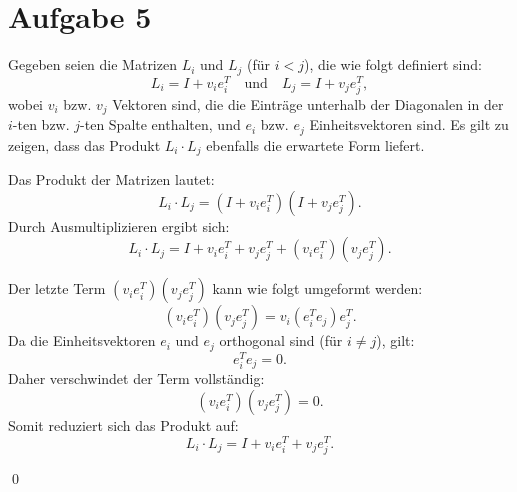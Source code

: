 \section{Aufgabe 5}

Gegeben seien die Matrizen \( L_i \) und \( L_j \) (für \( i < j \)), die wie folgt definiert sind:
\[
L_i = I + v_i e_i^T \quad \text{und} \quad L_j = I + v_j e_j^T,
\]
wobei \( v_i \) bzw. \( v_j \) Vektoren sind, die die Einträge unterhalb der Diagonalen in der \( i \)-ten bzw. \( j \)-ten Spalte enthalten, und \( e_i \) bzw. \( e_j \) Einheitsvektoren sind. Es gilt zu zeigen, dass das Produkt \( L_i \cdot L_j \) ebenfalls die erwartete Form liefert.

Das Produkt der Matrizen lautet:
\[
L_i \cdot L_j = (I + v_i e_i^T)(I + v_j e_j^T).
\]
Durch Ausmultiplizieren ergibt sich:
\[
L_i \cdot L_j = I + v_i e_i^T + v_j e_j^T + (v_i e_i^T)(v_j e_j^T).
\]

Der letzte Term \( (v_i e_i^T)(v_j e_j^T) \) kann wie folgt umgeformt werden:
\[
(v_i e_i^T)(v_j e_j^T) = v_i (e_i^T e_j) e_j^T.
\]
Da die Einheitsvektoren \( e_i \) und \( e_j \) orthogonal sind (für \( i \neq j \)), gilt:
\[
e_i^T e_j = 0.
\]
Daher verschwindet der Term vollständig:
\[
(v_i e_i^T)(v_j e_j^T) = 0.
\]
Somit reduziert sich das Produkt auf:
\[
L_i \cdot L_j = I + v_i e_i^T + v_j e_j^T.
\]

\qed
